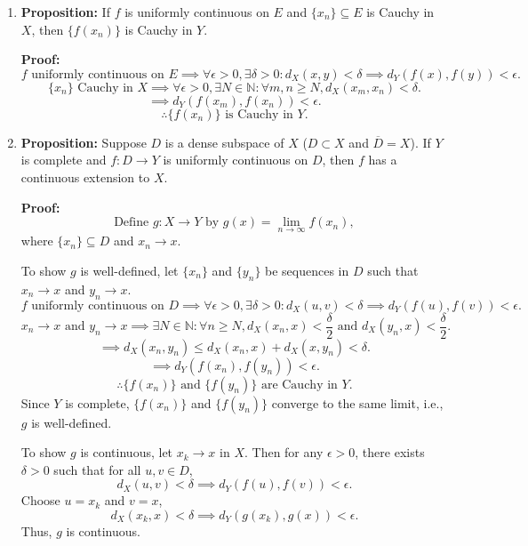 \documentclass{article}
\begin{document}
\begin{enumerate}
    \item \textbf{Proposition:} If \(f\) is uniformly continuous on \(E\) and \(\{x_n\} \subseteq E\) is Cauchy in \(X\), then \(\{f(x_n)\}\) is Cauchy in \(Y\).
    
    \textbf{Proof:}
    \[
    f \text{ uniformly continuous on } E \implies \forall \epsilon > 0, \exists \delta > 0 : d_X(x,y) < \delta \implies d_Y(f(x), f(y)) < \epsilon.
    \]
    \[
    \{x_n\} \text{ Cauchy in } X \implies \forall \epsilon > 0, \exists N \in \mathbb{N} : \forall m, n \geq N, d_X(x_m, x_n) < \delta.
    \]
    \[
    \implies d_Y(f(x_m), f(x_n)) < \epsilon.
    \]
    \[
    \therefore \{f(x_n)\} \text{ is Cauchy in } Y.
    \]
    
    \item \textbf{Proposition:} Suppose \(D\) is a dense subspace of \(X\) (\(D \subset X\) and \(\overline{D} = X\)). If \(Y\) is complete and \(f : D \to Y\) is uniformly continuous on \(D\), then \(f\) has a continuous extension to \(X\). 
    
    \textbf{Proof:}
    \[
    \text{Define } g : X \to Y \text{ by } g(x) = \lim_{n \to \infty} f(x_n),
    \]
    where \(\{x_n\} \subseteq D\) and \(x_n \to x\).
    
    To show \(g\) is well-defined, let \(\{x_n\}\) and \(\{y_n\}\) be sequences in \(D\) such that \(x_n \to x\) and \(y_n \to x\).
    \[
    f \text{ uniformly continuous on } D \implies \forall \epsilon > 0, \exists \delta > 0 : d_X(u, v) < \delta \implies d_Y(f(u), f(v)) < \epsilon.
    \]
    \[
    x_n \to x \text{ and } y_n \to x \implies \exists N \in \mathbb{N} : \forall n \geq N, d_X(x_n, x) < \frac{\delta}{2} \text{ and } d_X(y_n, x) < \frac{\delta}{2}.
    \]
    \[
    \implies d_X(x_n, y_n) \leq d_X(x_n, x) + d_X(x, y_n) < \delta.
    \]
    \[
    \implies d_Y(f(x_n), f(y_n)) < \epsilon.
    \]
    \[
    \therefore \{f(x_n)\} \text{ and } \{f(y_n)\} \text{ are Cauchy in } Y.
    \]
    Since \(Y\) is complete, \(\{f(x_n)\}\) and \(\{f(y_n)\}\) converge to the same limit, i.e., \(g\) is well-defined.

    To show \(g\) is continuous, let \(x_k \to x\) in \(X\). Then for any \(\epsilon > 0\), there exists \(\delta > 0\) such that for all \(u, v \in D\),
    \[
    d_X(u, v) < \delta \implies d_Y(f(u), f(v)) < \epsilon.
    \]
    Choose \(u = x_k\) and \(v = x\),
    \[
    d_X(x_k, x) < \delta \implies d_Y(g(x_k), g(x)) < \epsilon.
    \]
    Thus, \(g\) is continuous.
\end{enumerate}
\end{document}
